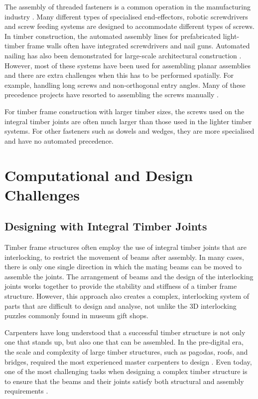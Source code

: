 The assembly of threaded fasteners is a common operation in the manufacturing industry \parencite{jiaSurveyAutomatedThreaded2019}. Many different types of specialised end-effectors, robotic screwdrivers and screw feeding systems are designed to accommodate different types of screws. In timber construction, the automated assembly lines for prefabricated light-timber frame walls often have integrated screwdrivers and nail guns. Automated nailing has also been demonstrated for large-scale architectural construction \parencite{apolinarskaComplexTimberStructures2018, apolinarskaSequentialRoof2016}. However, most of these systems have been used for assembling planar assemblies and there are extra challenges when this has to be performed spatially. For example, handling long screws and non-orthogonal entry angles. Many of these precedence projects have resorted to assembling the screws manually \parencite{apolinarskaRoboticAssemblyTimber2021, thomaRoboticFabricationBespoke2018, willmannNewParadigmsAutomatic2016}. 

For timber frame construction with larger timber sizes, the screws used on the integral timber joints are often much larger than those used in the lighter timber systems. For other fasteners such as dowels and wedges, they are more specialised and have no automated precedence. 

\section{Computational and Design Challenges}

\subsection{Designing with Integral Timber Joints}

Timber frame structures often employ the use of integral timber joints that are interlocking, to restrict the movement of beams after assembly. In many cases, there is only one single direction in which the mating beams can be moved to assemble the joints. The arrangement of beams and the design of the interlocking joints works together to provide the stability and stiffness of a timber frame structure. However, this approach also creates a complex, interlocking system of parts that are difficult to design and analyse, not unlike the 3D interlocking puzzles commonly found in museum gift shops.

Carpenters have long understood that a successful timber structure is not only one that stands up, but also one that can be assembled. In the pre-digital era, the scale and complexity of large timber structures, such as pagodas, roofs, and bridges, required the most experienced master carpenters to design \parencite{haymanTimberframedBuildings2021, hewettEnglishHistoricCarpentry2022, mullerHistoryDevelopmentStages2022, vandenabeeleJoiningTechniquesNineteenth2018}. Even today, one of the most challenging tasks when designing a complex timber structure is to ensure that the beams and their joints satisfy both structural and assembly requirements \parencite{chiltonTimberGridshellsArchitecture2016}.

